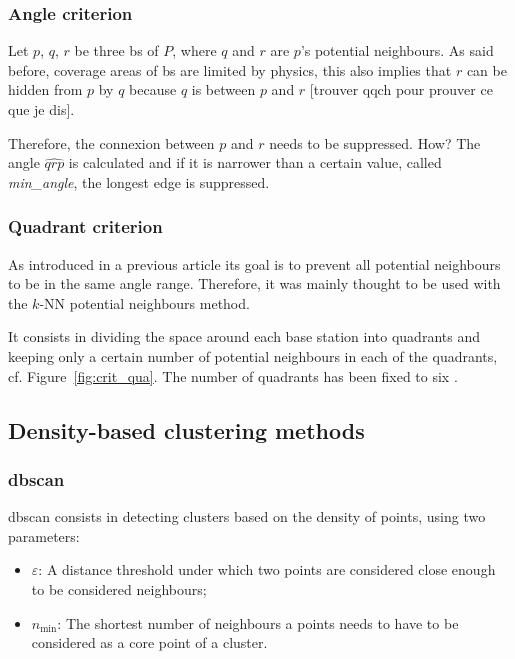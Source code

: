 \documentclass[lettersize,journal,english]{IEEEtran}
\begin{document}
        \subsubsection{Angle criterion}
            Let $p$, $q$, $r$ be three \acrshort{bs} of $P$, where $q$ and $r$ are $p$'s potential neighbours. As said before, coverage areas of \acrshort{bs} are limited by physics, this also implies that $r$ can be \og hidden\fg{} from $p$ by $q$ because $q$ is between $p$ and $r$ [trouver qqch pour prouver ce que je dis].

            Therefore, the connexion between $p$ and $r$ needs to be suppressed. How? The angle $\widehat{qrp}$ is calculated and if it is narrower than a certain value, called \emph{min\_angle}, the longest edge is suppressed.

        \subsubsection{Quadrant criterion}
            As introduced in a previous article \cite{10201211} its goal is to prevent all potential neighbours to be in the same angle range. Therefore, it was mainly thought to be used with the $k$-NN potential neighbours method.

            It consists in dividing the space around each base station into quadrants and keeping only a certain number of potential neighbours in each of the quadrants, cf. Figure~\ref{fig:crit_qua}.
            The number of quadrants has been fixed to six \cite{art_del_paq}.

    \subsection{Density-based clustering methods}
        \subsubsection{\acrshort{dbscan}}
            \acrshort{dbscan} consists in detecting clusters based on the density of points, using two parameters:
            \begin{itemize}
                \item \emph{$\varepsilon$}: A distance threshold under which two points are considered close enough to be considered neighbours;   
                \item \emph{$n_{\text{min}}$}: The shortest number of neighbours a points needs to have to be considered as a core point of a cluster.
            \end{itemize}
\end{document}
